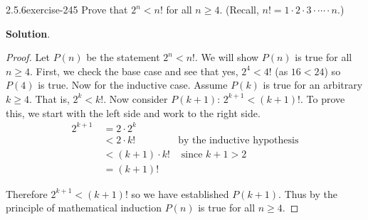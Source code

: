 \documentclass[twoside,11pt,]{book}
\numberwithin{equation}{chapter}
\newcommand{\lt}{<}
\newcommand{\gt}{>}
\newcommand{\amp}{&}
\begin{document}
\begin{divisionsolution}{2.5.6}{}{exercise-245}%
\hypertarget{p-3598}{}%
Prove that \(2^n \lt n!\) for all \(n \ge 4\). (Recall, \(n! = 1\cdot 2 \cdot 3 \cdot \cdots\cdot n\).)%
\par\smallskip%
\noindent\textbf{Solution}.\quad%
\begin{proof}{}
\hypertarget{p-3599}{}%
Let \(P(n)\) be the statement \(2^n \lt  n!\). We will show \(P(n)\) is true for all \(n \ge 4\). First, we check the base case and see that yes, \(2^4 \lt  4!\) (as \(16 \lt  24\)) so \(P(4)\) is true. Now for the inductive case. Assume \(P(k)\) is true for an arbitrary \(k \ge 4\). That is, \(2^k \lt  k!\). Now consider \(P(k+1)\): \(2^{k+1} \lt  (k+1)!\). To prove this, we start with the left side and work to the right side.%
\begin{align*}
2^{k+1}~ \amp = 2\cdot 2^k \amp\\
\amp \lt 2\cdot k! \amp \text{by the inductive hypothesis}\\
\amp \lt (k+1) \cdot k! \amp \text{ since } k+1 \gt 2\\
\amp = (k+1)! \amp
\end{align*}
%
\par
\hypertarget{p-3600}{}%
Therefore \(2^{k+1} \lt (k+1)!\) so we have established \(P(k+1)\). Thus by the principle of mathematical induction \(P(n)\) is true for all \(n \ge 4\).%
\end{proof}
\end{divisionsolution}%
\end{document}
